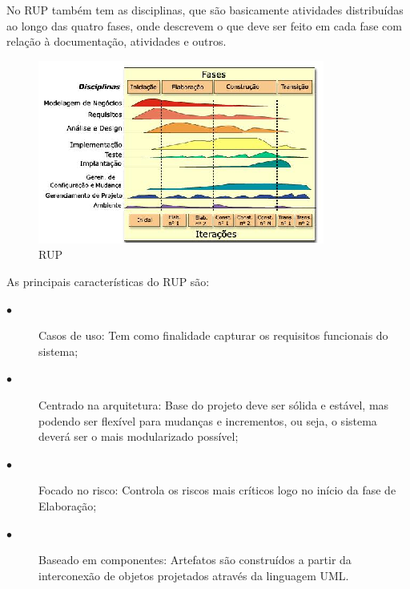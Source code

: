  
No RUP também tem as disciplinas, que são basicamente atividades distribuídas ao longo das quatro fases, onde descrevem o que deve ser feito em cada fase com relação à documentação, atividades e outros.
 \begin{figure}[!htpb]
	\centering
	\includegraphics[scale=2.0]{figuras/abordagem/Fases_RUP}
	\caption{RUP}
\end{figure}
As principais características do RUP são:
\begin{description}
		 \item[$\bullet$] Casos de uso: Tem como finalidade capturar os requisitos funcionais do sistema;
         \item[$\bullet$] Centrado na arquitetura: Base do projeto deve ser sólida e estável, mas podendo ser flexível para mudanças e incrementos, ou seja, o sistema deverá ser o mais modularizado possível;
         \item[$\bullet$] Focado no risco: Controla os riscos mais críticos logo no início da fase de Elaboração;
         \item[$\bullet$] Baseado em componentes: Artefatos são construídos a partir da interconexão de objetos projetados através da linguagem UML.
\end{description}
         

